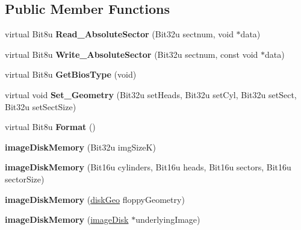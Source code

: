 \subsection*{Public Member Functions}
\begin{DoxyCompactItemize}
\item 
\hypertarget{classimageDiskMemory_a67a4fdb7bfea226898ca6c9801350708}{virtual Bit8u {\bfseries Read\-\_\-\-Absolute\-Sector} (Bit32u sectnum, void $\ast$data)}\label{classimageDiskMemory_a67a4fdb7bfea226898ca6c9801350708}

\item 
\hypertarget{classimageDiskMemory_aeb828d76bb273e76bb7a5c7f6f333c9c}{virtual Bit8u {\bfseries Write\-\_\-\-Absolute\-Sector} (Bit32u sectnum, const void $\ast$data)}\label{classimageDiskMemory_aeb828d76bb273e76bb7a5c7f6f333c9c}

\item 
\hypertarget{classimageDiskMemory_a608088213822277c5fa95c90929d4ec2}{virtual Bit8u {\bfseries Get\-Bios\-Type} (void)}\label{classimageDiskMemory_a608088213822277c5fa95c90929d4ec2}

\item 
\hypertarget{classimageDiskMemory_a72accc9b21eae2c51f9960803501e221}{virtual void {\bfseries Set\-\_\-\-Geometry} (Bit32u set\-Heads, Bit32u set\-Cyl, Bit32u set\-Sect, Bit32u set\-Sect\-Size)}\label{classimageDiskMemory_a72accc9b21eae2c51f9960803501e221}

\item 
\hypertarget{classimageDiskMemory_a23db6ca32da16437703d513ad9500138}{virtual Bit8u {\bfseries Format} ()}\label{classimageDiskMemory_a23db6ca32da16437703d513ad9500138}

\item 
\hypertarget{classimageDiskMemory_ae32d8a89882a15795e0199b0c0f08df3}{{\bfseries image\-Disk\-Memory} (Bit32u img\-Size\-K)}\label{classimageDiskMemory_ae32d8a89882a15795e0199b0c0f08df3}

\item 
\hypertarget{classimageDiskMemory_a675c60b8edb18d977a1d234e4d25ac1b}{{\bfseries image\-Disk\-Memory} (Bit16u cylinders, Bit16u heads, Bit16u sectors, Bit16u sector\-Size)}\label{classimageDiskMemory_a675c60b8edb18d977a1d234e4d25ac1b}

\item 
\hypertarget{classimageDiskMemory_a381a4894bb6e5931f75877728d40f0e8}{{\bfseries image\-Disk\-Memory} (\hyperlink{structdiskGeo}{disk\-Geo} floppy\-Geometry)}\label{classimageDiskMemory_a381a4894bb6e5931f75877728d40f0e8}

\item 
\hypertarget{classimageDiskMemory_a45479f6fe646d2e184809cd5c37dc1d8}{{\bfseries image\-Disk\-Memory} (\hyperlink{classimageDisk}{image\-Disk} $\ast$underlying\-Image)}\label{classimageDiskMemory_a45479f6fe646d2e184809cd5c37dc1d8}

\end{DoxyCompactItemize}


